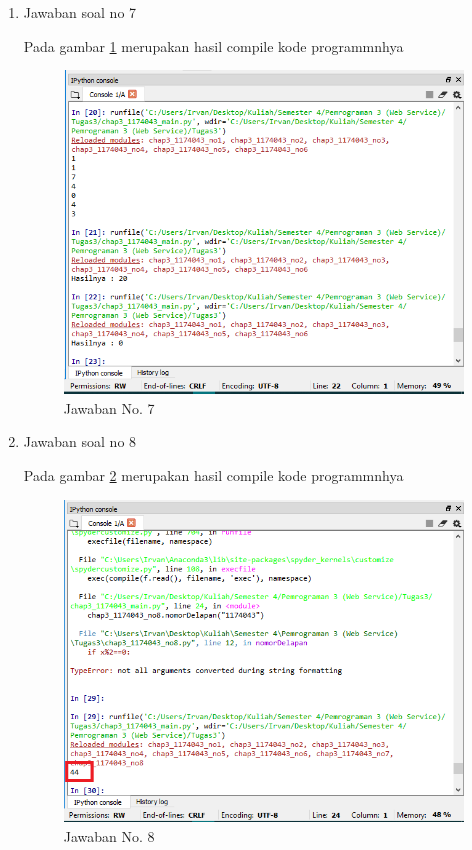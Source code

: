 \begin{enumerate}
				
			\item Jawaban soal no 7
				

				\subitem Pada gambar \ref{gambar7} merupakan hasil compile kode programmnhya					

				\begin{figure} [ht]
					\centerline{\includegraphics[width=1\textwidth]{figures/chapter3/7_1174043.png}}
					\caption{Jawaban No. 7}
					\label{gambar7}
				\end{figure}

				
			\item Jawaban soal no 8
				

				\subitem Pada gambar \ref{gambar8} merupakan hasil compile kode programmnhya					

				\begin{figure} [ht]
					\centerline{\includegraphics[width=1\textwidth]{figures/chapter3/8_1174043.png}}
					\caption{Jawaban No. 8}
					\label{gambar8}
				\end{figure}


\end{enumerate}
